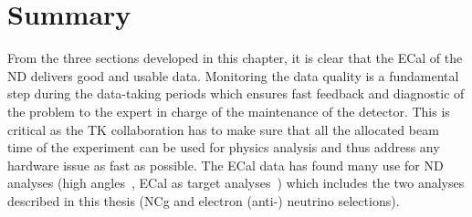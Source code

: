 \section{Summary}
\label{sec:dqsummary}
From the three sections developed in this chapter, it is clear that
the \Gls{ECal} of the \Gls{ND} delivers good and usable
data. Monitoring the data quality is a fundamental step during the
data-taking periods which ensures fast feedback and diagnostic of the
problem to the expert in charge of the maintenance of the
detector. This is critical as the \Gls{TK} collaboration has to make
sure that all the allocated beam time of the experiment can be used
for physics analysis and thus address any hardware issue as fast as
possible. The \Gls{ECal} data has found many use for \Gls{ND} analyses
(high angles~\cite{TN310,TN348}, \Gls{ECal} as target
analyses~\cite{DomBrailsford2016}) which includes the two analyses
described in this thesis (\Gls{NCg} and electron (anti-) neutrino
selections).




